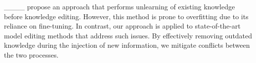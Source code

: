 
____ propose an approach that performs unlearning of existing knowledge before knowledge editing. However, this method is prone to overfitting due to its reliance on fine-tuning. In contrast, our approach is applied to state-of-the-art model editing methods that address such issues. By effectively removing outdated knowledge during the injection of new information, we mitigate conflicts between the two processes.